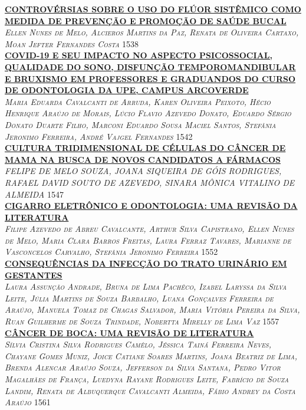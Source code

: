 \noindent \textsc{\hyperlink{trabalhos/250410.pdf.1}{\textbf{CONTROVÉRSIAS SOBRE O USO DO FLÚOR SISTÊMICO COMO MEDIDA DE PREVENÇÃO E PROMOÇÃO DE SAÚDE BUCAL }}}\\ 
\noindent \textsc{\textit{Ellen Nunes de Melo, Alcieros Martins da Paz, Renata de Oliveira Cartaxo, Moan Jefter Fernandes Costa}} \hfill 1538\\ 

\noindent \textsc{\hyperlink{trabalhos/250184.pdf.1}{\textbf{COVID-19 E SEU IMPACTO NO ASPECTO PSICOSSOCIAL, QUALIDADE DO SONO, DISFUNÇÃO TEMPOROMANDIBULAR E BRUXISMO EM PROFESSORES E GRADUANDOS DO CURSO DE ODONTOLOGIA DA UPE, CAMPUS ARCOVERDE}}}\\ 
\noindent \textsc{\textit{Maria Eduarda Cavalcanti de Arruda, Karen Oliveira Peixoto, Hécio Henrique Araújo de Morais, Lúcio Flavio Azevedo Donato, Eduardo Sérgio Donato Duarte Filho, Marconi Eduardo Sousa Maciel Santos, Stefânia Jeronimo Ferreira, André Vajgel Fernandes}} \hfill 1542\\ 

\noindent \textsc{\hyperlink{trabalhos/249532.pdf.1}{\textbf{CULTURA TRIDIMENSIONAL DE CÉLULAS DO CÂNCER DE MAMA NA BUSCA DE NOVOS CANDIDATOS A FÁRMACOS}}}\\ 
\noindent \textsc{\textit{FELIPE DE MELO SOUZA, JOANA SIQUEIRA DE GÓIS RODRIGUES, RAFAEL DAVID SOUTO DE AZEVEDO, SINARA MÔNICA VITALINO DE ALMEIDA}} \hfill 1547\\ 

\noindent \textsc{\hyperlink{trabalhos/251536.pdf.1}{\textbf{CIGARRO ELETRÔNICO E ODONTOLOGIA: UMA REVISÃO DA LITERATURA}}}\\ 
\noindent \textsc{\textit{Filipe Azevedo de Abreu Cavalcante, Arthur Silva Capistrano, Ellen Nunes de Melo, Maria Clara Barros Freitas, Laura Ferraz Tavares, Marianne de Vasconcelos Carvalho, Stefânia Jeronimo Ferreira}} \hfill 1552\\ 

\noindent \textsc{\hyperlink{trabalhos/251659.pdf.1}{\textbf{CONSEQUÊNCIAS DA INFECÇÃO DO TRATO URINÁRIO EM GESTANTES}}}\\ 
\noindent \textsc{\textit{Laura Assunção Andrade, Bruna de Lima Pachêco, Izabel Laryssa da Silva Leite, Júlia Martins de Souza Barbalho, Luana Gonçalves Ferreira de Araújo, Manuela Tomaz de Chagas Salvador, Maria Vitória Pereira da Silva, Ruan Guilherme de Souza Trindade, Nobertta Mirelly de Lima Vaz}} \hfill 1557\\ 

\noindent \textsc{\hyperlink{trabalhos/249848.pdf.1}{\textbf{CÂNCER DE BOCA: UMA REVISÃO DE LITERATURA}}}\\ 
\noindent \textsc{\textit{Sílvia Cristina Silva Rodrigues Camêlo, Jéssica Tainá Ferreira Neves, Chayane Gomes Muniz, Joice Catiane Soares Martins, Joana Beatriz de Lima, Brenda Alencar Araújo Souza, Jefferson da Silva Santana, Pedro Vitor Magalhães de França, Luedyna Rayane Rodrigues Leite, Fabrício de Souza Landim, Renata de Albuquerque Cavalcanti Almeida, Fábio Andrey da Costa Araújo}} \hfill 1561\\ 

